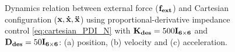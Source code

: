 \begin{figure}
\centering
{}
\caption{Dynamics relation between external force ($\mathbf{f_{ext}}$) and Cartesian configuration ($\mathbf{x, \dot{x}, \ddot{x}}$) using proportional-derivative impedance control \eqref{eq:cartesian_PDI_N} with $\mathbf{K_{des}}=500\mathbf{I_{6 \times 6}}$ and $\mathbf{D_{des}}=50\mathbf{I_{6 \times 6}}$: (a) position, (b) velocity and (c) acceleration.}
\label{fig:act2.2_external_force_vs_cartesian_configuration}
\end{figure}


